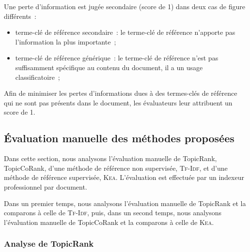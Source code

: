         Une perte d'information est jugée secondaire (score de 1) dans deux
        cas de figure différents~:
        \begin{itemize}
          \item{terme-clé de référence secondaire~: le terme-clé de référence
                n'apporte pas l'information la plus importante~;}
          \item{terme-clé de référence générique~: le terme-clé de référence
                n'est pas suffisamment spécifique au contenu du document, il a
                un usage classificatoire~;}
        \end{itemize}
        Afin de minimiser les pertes d'informations dues à des termes-clés de
        référence qui ne sont pas présents dans le document, les évaluateurs
        leur attribuent un score de 1.

    \subsection{Évaluation manuelle des méthodes proposées}
    \label{subsec:main-domain_specific_keyphrase_annotation-manual_evaluation-analysis}
      Dans cette section, nous analysons l'évaluation manuelle de TopicRank,
      TopicCoRank, d'une méthode de référence non supervisée, \textsc{Tf-Idf},
      et d'une méthode de référence supervisée, \textsc{Kea}. L'évaluation est
      effectuée par un indexeur professionnel par document.

      Dans un premier temps, nous analysons l'évaluation manuelle de TopicRank
      et la comparons à celle de \textsc{Tf-Idf}, puis, dans un second temps,
      nous analysons l'évaluation manuelle de TopicCoRank et la comparons à
      celle de \textsc{Kea}.

      \subsubsection{Analyse de TopicRank}
      \label{subsubsec:main-domain_specific_keyphrase_annotation-manual_evaluation-analysis-topicrank}
        \TODO{\dots}
      
